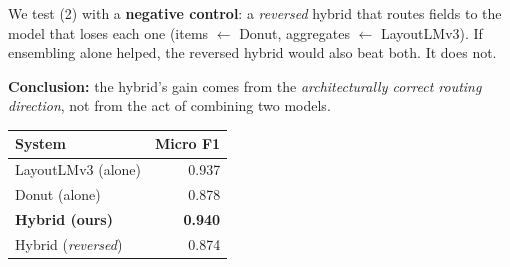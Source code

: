 \documentclass[landscape,a0paper,fontscale=0.285]{baposter}
\begin{document}
\begin{poster}
{\begin{minipage}{0.55\textwidth}
We test (2) with a \textbf{negative control}: a \emph{reversed} hybrid that routes
fields to the model that loses each one (items $\leftarrow$ Donut, aggregates
$\leftarrow$ LayoutLMv3). If ensembling alone helped, the reversed hybrid would also
beat both. It does not.

\medskip

\textbf{Conclusion:} the hybrid's gain comes from the \emph{architecturally correct
routing direction}, not from the act of combining two models.
\end{minipage}
\hfill
\begin{minipage}{0.42\textwidth}
\centering
\renewcommand{\arraystretch}{1.2}
\begin{tabular}{lr}
\toprule
\textbf{System} & \textbf{Micro F1} \\
\midrule
LayoutLMv3 (alone)        & 0.937 \\
Donut (alone)             & 0.878 \\
\rowcolor{wingreen}\textbf{Hybrid (ours)}            & \textbf{0.940} \\
\rowcolor{lossred}Hybrid (\emph{reversed})  & 0.874 \\
\bottomrule
\end{tabular}
\end{minipage}
}


\end{poster}
\end{document}
